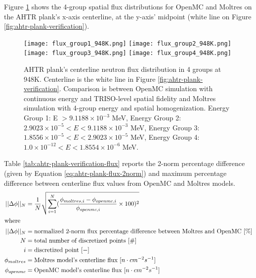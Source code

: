 Figure \ref{fig:flux_948K} shows the 4-group spatial flux distributions for OpenMC 
and Moltres on the \gls{AHTR} plank's x-axis centerline, at the y-axis' 
midpoint (white line on Figure \ref{fig:ahtr-plank-verification}). 
\begin{figure}[htbp]
    \centering
    \texttt{[image: flux\_group1\_948K.png]} 
    \texttt{[image: flux\_group2\_948K.png]} 
    \texttt{[image: flux\_group3\_948K.png]} 
    \texttt{[image: flux\_group4\_948K.png]} 
    \caption{\acrfull{AHTR} plank's centerline neutron flux distribution 
    in 4 groups at 948K. 
    Centerline is the white line in Figure \ref{fig:ahtr-plank-verification}.
    Comparison is between OpenMC simulation with continuous energy 
    and TRISO-level spatial fidelity and Moltres simulation with 4-group energy and 
    spatial homogenization.  
    Energy Group 1: E $> 9.1188 \times 10^{-3}$ MeV, 
    Energy Group 2: $2.9023 \times 10^{-5} < E < 9.1188 \times 10^{-3}$ MeV,
    Energy Group 3:  $1.8556 \times 10^{-5} < E < 2.9023 \times 10^{-5}$ MeV,
    Energy Group 4:  $1.0 \times 10^{-12} < E < 1.8554 \times 10^{-6}$ MeV.}
    \label{fig:flux_948K}
\end{figure}
Table \ref{tab:ahtr-plank-verification-flux} reports the 2-norm percentage difference 
(given by Equation \ref{eq:ahtr-plank-flux-2norm}) and maximum percentage difference 
between centerline flux values from OpenMC and Moltres models. 
\begin{align}
    \label{eq:ahtr-plank-flux-2norm}
    ||\Delta \phi||_N &= \frac{1}{N}\sqrt{\sum_{i=1}^N(\frac{\phi_{moltres, i} - \phi_{openmc, i}}{\phi_{openmc, i}}\times100)^2} \\
\intertext{where}
    ||\Delta \phi||_N &= \mbox{normalized 2-norm flux percentage difference between Moltres and OpenMC } [\%] \nonumber \\
    N &= \mbox{total number of discretized points } [\#] \nonumber \\
    i &= \mbox{discretized point } [-] \nonumber \\
    \phi_{moltres} &= \mbox{Moltres model's centerline flux } [n \cdot cm^{-2}s^{-1}] \nonumber \\
    \phi_{openmc} &= \mbox{OpenMC model's centerline flux } [n \cdot cm^{-2}s^{-1}] \nonumber 
\end{align} 
